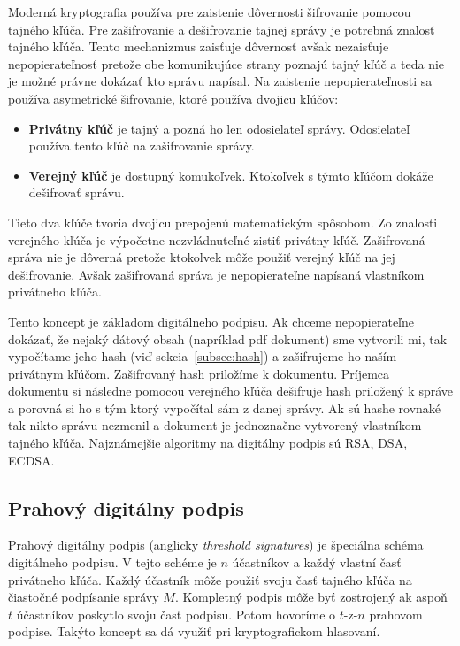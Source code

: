 Moderná kryptografia používa pre zaistenie dôvernosti šifrovanie pomocou tajného kľúča. Pre zašifrovanie a dešifrovanie tajnej správy je potrebná znalosť tajného kľúča. Tento mechanizmus  zaisťuje dôvernosť avšak nezaisťuje nepopierateľnosť pretože obe komunikujúce strany poznajú tajný kľúč a teda nie je možné právne dokázať kto správu napísal. Na zaistenie nepopierateľnosti sa používa asymetrické šifrovanie, ktoré používa dvojicu kľúčov:
\begin{itemize}
	\item \textbf{Privátny kľúč} je tajný a pozná ho len odosielateľ správy. Odosielateľ používa tento kľúč na zašifrovanie správy.
	\item \textbf{Verejný kľúč} je dostupný komukoľvek. Ktokoľvek s týmto kľúčom dokáže dešifrovať správu.
\end{itemize}
Tieto dva kľúče tvoria dvojicu prepojenú matematickým spôsobom. Zo znalosti verejného kľúča je výpočetne nezvládnuteľné zistiť privátny kľúč. Zašifrovaná správa nie je dôverná pretože ktokoľvek môže použiť verejný kľúč na jej dešifrovanie. Avšak zašifrovaná správa je nepopierateľne napísaná vlastníkom privátneho kľúča. 

Tento koncept je základom digitálneho podpisu. Ak chceme nepopierateľne dokázať, že nejaký dátový obsah (napríklad pdf dokument) sme vytvorili mi, tak vypočítame jeho hash (viď sekcia~\ref{subsec:hash}) a zašifrujeme ho naším privátnym kľúčom. Zašifrovaný hash priložíme k dokumentu. Príjemca dokumentu si následne pomocou verejného kľúča dešifruje hash priložený k správe a porovná si ho s tým ktorý vypočítal sám z danej správy. Ak sú hashe rovnaké tak nikto správu nezmenil a dokument je jednoznačne vytvorený vlastníkom tajného kľúča. Najznámejšie algoritmy na digitálny podpis sú RSA, DSA, ECDSA.~\cite{cryptoHandbook}

\subsection{Prahový digitálny podpis}\label{subsec:threshold-sig}
Prahový digitálny podpis (anglicky \textit{threshold signatures}) je špeciálna schéma digitálneho podpisu. V tejto schéme je $n$ účastníkov a každý vlastní časť privátneho kľúča. Každý účastník môže použiť svoju časť tajného kľúča na čiastočné podpísanie správy $M$. Kompletný podpis môže byť zostrojený ak aspoň $t$ účastníkov poskytlo svoju časť podpisu. Potom hovoríme o  $t$-z-$n$ prahovom podpise. Takýto koncept sa dá využiť pri kryptografickom hlasovaní.~\cite{blsSignature}


